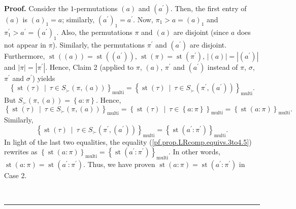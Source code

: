 \documentclass[numbers=enddot,12pt,final,onecolumn,notitlepage]{scrartcl}%
\theoremstyle{definition}
\newenvironment{proof}[1][Proof]{\noindent\textbf{#1.} }{\ \rule{0.5em}{0.5em}}
\newenvironment{verlong}{}{}
\begin{document}
\begin{verlong}
\begin{proof}
Consider the $1$-permutations $\left(  a\right)  $ and $\left(  a^{\prime
}\right)  $. Then, the first entry of $\left(  a\right)  $ is $\left(
a\right)  _{1}=a$; similarly, $\left(  a^{\prime}\right)  _{1}=a^{\prime}$.
Now, $\pi_{1}>a=\left(  a\right)  _{1}$ and $\pi_{1}^{\prime}>a^{\prime
}=\left(  a^{\prime}\right)  _{1}$. Also, the permutations $\pi$ and $\left(
a\right)  $ are disjoint (since $a$ does not appear in $\pi$). Similarly, the
permutations $\pi^{\prime}$ and $\left(  a^{\prime}\right)  $ are disjoint.
Furthermore, $\operatorname*{st}\left(  \left(  a\right)  \right)
=\operatorname*{st}\left(  \left(  a^{\prime}\right)  \right)  $,
$\operatorname*{st}\left(  \pi\right)  =\operatorname*{st}\left(  \pi^{\prime
}\right)  $, $\left\vert \left(  a\right)  \right\vert =\left\vert \left(
a^{\prime}\right)  \right\vert $ and $\left\vert \pi\right\vert =\left\vert
\pi^{\prime}\right\vert $. Hence, Claim 2 (applied to $\pi$, $\left(
a\right)  $, $\pi^{\prime}$ and $\left(  a^{\prime}\right)  $ instead of $\pi
$, $\sigma$, $\pi^{\prime}$ and $\sigma^{\prime}$) yields%
\begin{equation}
\left\{  \operatorname*{st}\left(  \tau\right)  \ \mid\ \tau\in S_{\succ
}\left(  \pi,\left(  a\right)  \right)  \right\}  _{\operatorname*{multi}%
}=\left\{  \operatorname*{st}\left(  \tau\right)  \ \mid\ \tau\in S_{\succ
}\left(  \pi^{\prime},\left(  a^{\prime}\right)  \right)  \right\}
_{\operatorname*{multi}}. \label{pf.prop.LRcomp.equivs.3to4.5}%
\end{equation}
But $S_{\succ}\left(  \pi,\left(  a\right)  \right)  =\left\{  a:\pi\right\}
$. Hence,%
\[
\left\{  \operatorname*{st}\left(  \tau\right)  \ \mid\ \tau\in S_{\succ
}\left(  \pi,\left(  a\right)  \right)  \right\}  _{\operatorname*{multi}%
}=\left\{  \operatorname*{st}\left(  \tau\right)  \ \mid\ \tau\in\left\{
a:\pi\right\}  \right\}  _{\operatorname*{multi}}=\left\{  \operatorname*{st}%
\left(  a:\pi\right)  \right\}  _{\operatorname*{multi}}.
\]
Similarly,%
\[
\left\{  \operatorname*{st}\left(  \tau\right)  \ \mid\ \tau\in S_{\succ
}\left(  \pi^{\prime},\left(  a^{\prime}\right)  \right)  \right\}
_{\operatorname*{multi}}=\left\{  \operatorname*{st}\left(  a^{\prime}%
:\pi^{\prime}\right)  \right\}  _{\operatorname*{multi}}.
\]
In light of the last two equalities, the equality
(\ref{pf.prop.LRcomp.equivs.3to4.5}) rewrites as $\left\{  \operatorname*{st}%
\left(  a:\pi\right)  \right\}  _{\operatorname*{multi}}=\left\{
\operatorname*{st}\left(  a^{\prime}:\pi^{\prime}\right)  \right\}
_{\operatorname*{multi}}$. In other words, $\operatorname*{st}\left(
a:\pi\right)  =\operatorname*{st}\left(  a^{\prime}:\pi^{\prime}\right)  $.
Thus, we have proven $\operatorname*{st}\left(  a:\pi\right)
=\operatorname*{st}\left(  a^{\prime}:\pi^{\prime}\right)  $ in Case 2.


\end{proof}
\end{verlong}
\end{document}
